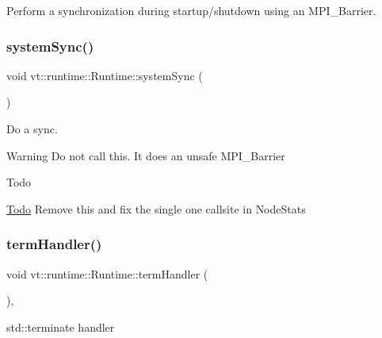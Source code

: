 Perform a synchronization during startup/shutdown using an {\ttfamily M\+P\+I\+\_\+\+Barrier}. 

\mbox{\label{structvt_1_1runtime_1_1_runtime_a34252fc839ea767c8fca1efb97918385}} 
\subsubsection{\texorpdfstring{system\+Sync()}{systemSync()}}
{\footnotesize\ttfamily void vt\+::runtime\+::\+Runtime\+::system\+Sync (\begin{DoxyParamCaption}{ }\end{DoxyParamCaption})\hspace{0.3cm}{\ttfamily [inline]}}



Do a sync. 

\begin{DoxyWarning}{Warning}
Do not call this. It does an unsafe {\ttfamily M\+P\+I\+\_\+\+Barrier} 
\end{DoxyWarning}
\begin{DoxyRefDesc}{Todo}
\item[\hyperlink{todo__todo000001}{Todo}]Remove this and fix the single one callsite in {\ttfamily Node\+Stats} \end{DoxyRefDesc}
\mbox{\label{structvt_1_1runtime_1_1_runtime_abe295b9ea216fafe2b494e2bc609f8fb}} 
\subsubsection{\texorpdfstring{term\+Handler()}{termHandler()}}
{\footnotesize\ttfamily void vt\+::runtime\+::\+Runtime\+::term\+Handler (\begin{DoxyParamCaption}{ }\end{DoxyParamCaption})\hspace{0.3cm}{\ttfamily [static]}, {\ttfamily [protected]}}



std\+::terminate handler 

